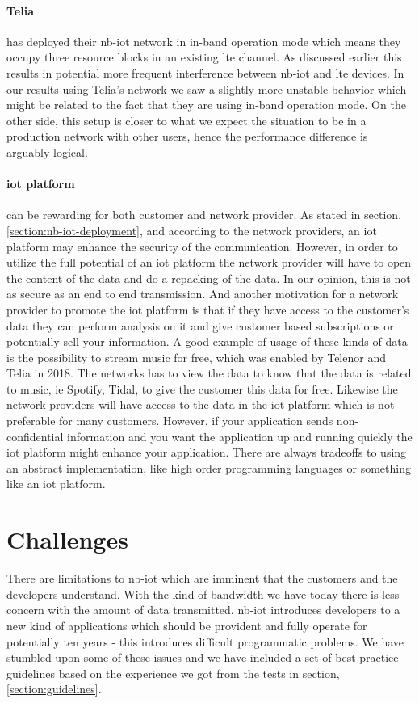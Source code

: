 \documentclass[USenglish]{ifimaster}  %
\begin{document}
\paragraph{Telia} has deployed their \acrshort{nb-iot} network in in-band operation mode which means they occupy three resource blocks in an existing \acrshort{lte} channel. As discussed earlier this results in potential more frequent interference between \acrshort{nb-iot} and \acrshort{lte} devices. In our results using Telia's network we saw a slightly more unstable behavior which might be related to the fact that they are using in-band operation mode. On the other side, this setup is closer to what we expect the situation to be in a production network with other users, hence the performance difference is arguably logical.

\paragraph{\acrshort{iot} platform} can be rewarding for both customer and network provider. As stated in section, \vref{section:nb-iot-deployment}, and according to the network providers, an \acrshort{iot} platform may enhance the security of the communication. However, in order to utilize the full potential of an \acrshort{iot} platform the network provider will have to open the content of the data and do a repacking of the data. In our opinion, this is not as secure as an end to end transmission. And another motivation for a network provider to promote the \acrshort{iot} platform is that if they have access to the customer's data they can perform analysis on it and give customer based subscriptions or potentially sell your information. A good example of usage of these kinds of data is the possibility to stream music for free, which was enabled by Telenor and Telia in 2018. The networks has to view the data to know that the data is related to music, ie Spotify, Tidal, to give the customer this data for free. Likewise the network providers will have access to the data in the \acrshort{iot} platform which is not preferable for many customers. However, if your application sends non-confidential information and you want the application up and running quickly the \acrshort{iot} platform might enhance your application. There are always tradeoffs to using an abstract implementation, like high order programming languages or something like an \acrshort{iot} platform.

\section{Challenges} \label{section:challenges}
There are limitations to \acrshort{nb-iot} which are imminent that the customers and the developers understand. With the kind of bandwidth we have today there is less concern with the amount of data transmitted. \acrshort{nb-iot} introduces developers to a new kind of applications which should be provident and fully operate for potentially ten years - this introduces difficult programmatic problems. We have stumbled upon some of these issues and we have included a set of best practice guidelines based on the experience we got from the tests in section, \vref{section:guidelines}.
\end{document}
